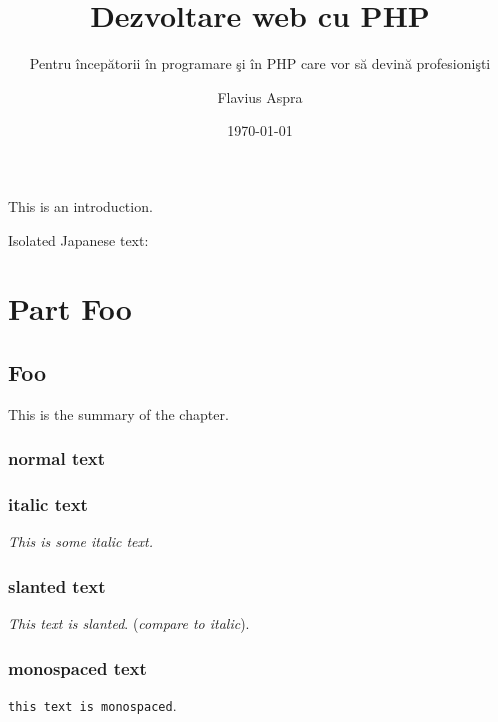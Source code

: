 \documentclass[a4paper,12pt,fleqn,twoside,openright,style=phpro]{yapbook}
\title{Dezvoltare web cu PHP}
\subtitle{Pentru începătorii în programare şi în PHP care vor să devină profesionişti}
\author{Flavius Aspra}
\date{\today}
\begin{document}
\frontmatter

    \maketitle

    \makecopyright

    \tableofcontents


        This is an introduction.

        Isolated Japanese text: 

\mainmatter

    \part{Part Foo}

        \chapter{Foo}
            \begin{chapsummary}
            This is the summary
            of the chapter.

            \lipsum[1]

            \end{chapsummary}

            \lipsum[1]

            \section{normal text}

            \section{italic text}
            \textit{This is some italic text.}

            \section{slanted text}
            \textsl{This text is slanted}. (\textit{compare to italic}).

            \section{monospaced text}
            \texttt{this text is monospaced}.
\end{document}

